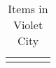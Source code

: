 \begin{longtable}{|| l l l l ||}%
\hline%
\endhead%
\hline%
\caption{Items in Violet City}%
\label{tab:VioletCityItems}%
\end{longtable}